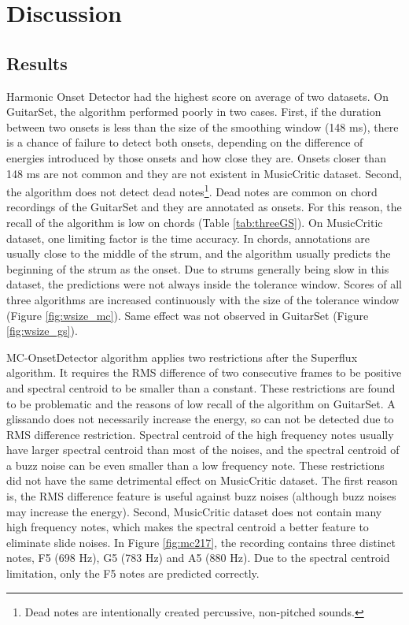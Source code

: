 \chapter{Discussion}

\section{Results}

Harmonic Onset Detector had the highest score on average of two datasets. On GuitarSet, the algorithm performed poorly in two cases. First, if the duration between two onsets is less than the size of the smoothing window (148 ms), there is a chance of failure to detect both onsets, depending on the difference of energies introduced by those onsets and how close they are. Onsets closer than 148 ms are not common and they are not existent in MusicCritic dataset. Second, the algorithm does not detect dead notes\footnote{Dead notes are intentionally created percussive, non-pitched sounds.}. Dead notes are common on chord recordings of the GuitarSet and they are annotated as onsets. For this reason, the recall of the algorithm is low on chords (Table \ref{tab:threeGS}). On MusicCritic dataset, one limiting factor is the time accuracy. In chords, annotations are usually close to the middle of the strum, and the algorithm usually predicts the beginning of the strum as the onset. Due to strums generally being slow in this dataset, the predictions were not always inside the tolerance window. Scores of all three algorithms are increased continuously with the size of the tolerance window (Figure \ref{fig:wsize_mc}). Same effect was not observed in GuitarSet (Figure \ref{fig:wsize_gs}).  

MC-OnsetDetector algorithm applies two restrictions after the Superflux algorithm. It requires the RMS difference of two consecutive frames to be positive and spectral centroid to be smaller than a constant. These restrictions are found to be problematic and the reasons of low recall of the algorithm on GuitarSet. A glissando does not necessarily increase the energy, so can not be detected due to RMS difference restriction. Spectral centroid of the high frequency notes usually have larger spectral centroid than most of the noises, and the spectral centroid of a buzz noise can be even smaller than a low frequency note. These restrictions did not have the same detrimental effect on MusicCritic dataset. The first reason is, the RMS difference feature is useful against buzz noises (although buzz noises may increase the energy). Second, MusicCritic dataset does not contain many high frequency notes, which makes the spectral centroid a better feature to eliminate slide noises. In Figure \ref{fig:mc217}, the recording contains three distinct notes, F5 (698 Hz), G5 (783 Hz) and A5 (880 Hz). Due to the spectral centroid limitation, only the F5 notes are predicted correctly.  

